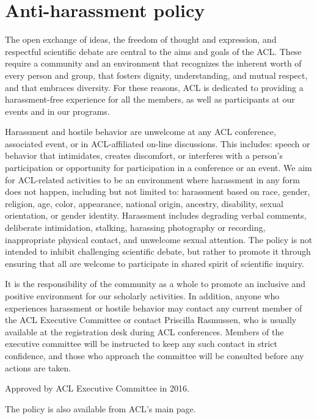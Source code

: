 \chapter[Anti-harassment policy]{Anti-harassment policy}
\thispagestyle{emptyheader}
\setheaders{}{}
The open exchange of ideas, the freedom of thought and expression, and respectful scientific debate are central to the aims and goals of the ACL. These require a community and an environment that recognizes the inherent worth of every person and group, that fosters dignity, understanding, and mutual respect, and that embraces diversity. For these reasons, ACL is dedicated to providing a harassment-free experience for all the members, as well as participants at our events and in our programs.

Harassment and hostile behavior are unwelcome at any ACL conference, associated event, or in ACL-affiliated on-line discussions. This includes: speech or behavior that intimidates, creates discomfort, or interferes with a person’s participation or opportunity for participation in a conference or an event. We aim for ACL-related activities to be an environment where harassment in any form does not happen, including but not limited to: harassment based on race, gender, religion, age, color, appearance, national origin, ancestry, disability, sexual orientation, or gender identity. Harassment includes degrading verbal comments, deliberate intimidation, stalking, harassing photography or recording, inappropriate physical contact, and unwelcome sexual attention. The policy is not intended to inhibit challenging scientific debate, but rather to promote it through ensuring that all are welcome to participate in shared spirit of scientific inquiry.

It is the responsibility of the community as a whole to promote an inclusive and positive environment for our scholarly activities. In addition, anyone who experiences harassment or hostile behavior may contact any current member of the ACL Executive Committee or contact Priscilla Rasmussen, who is usually available at the registration desk during ACL conferences. Members of the executive committee will be instructed to keep any such contact in strict confidence, and those who approach the committee will be consulted before any actions are taken.

Approved by ACL Executive Committee in 2016.

The policy is also available from ACL’s main page.
